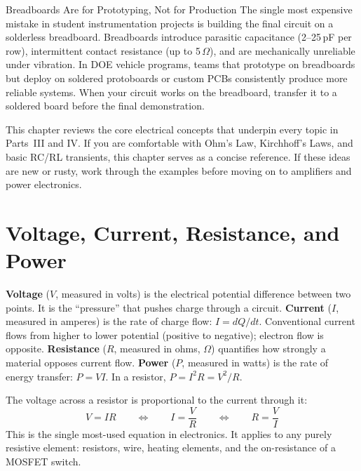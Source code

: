 \documentclass[11pt,letterpaper,twoside,openany]{book}
\begin{document}
\begin{industrybox}{Breadboards Are for Prototyping, Not for Production}
The single most expensive mistake in student instrumentation projects is building the final circuit on a solderless breadboard. Breadboards introduce parasitic capacitance (2--25\,pF per row), intermittent contact resistance (up to 5\,$\Omega$), and are mechanically unreliable under vibration. In DOE vehicle programs, teams that prototype on breadboards but deploy on soldered protoboards or custom PCBs consistently produce more reliable systems. When your circuit works on the breadboard, transfer it to a soldered board before the final demonstration.
\end{industrybox}

This chapter reviews the core electrical concepts that underpin every topic in Parts~III and IV. If you are comfortable with Ohm's Law, Kirchhoff's Laws, and basic RC/RL transients, this chapter serves as a concise reference. If these ideas are new or rusty, work through the examples before moving on to amplifiers and power electronics.

\section{Voltage, Current, Resistance, and Power}

\textbf{Voltage} ($V$, measured in volts) is the electrical potential difference between two points. It is the ``pressure'' that pushes charge through a circuit. \textbf{Current} ($I$, measured in amperes) is the rate of charge flow: $I = dQ/dt$. Conventional current flows from higher to lower potential (positive to negative); electron flow is opposite. \textbf{Resistance} ($R$, measured in ohms, $\Omega$) quantifies how strongly a material opposes current flow. \textbf{Power} ($P$, measured in watts) is the rate of energy transfer: $P = VI$. In a resistor, $P = I^2 R = V^2/R$.

\begin{keyconceptbox}
The voltage across a resistor is proportional to the current through it:
\begin{equation}
V = IR \qquad \Leftrightarrow \qquad I = \frac{V}{R} \qquad \Leftrightarrow \qquad R = \frac{V}{I}
\end{equation}
This is the single most-used equation in electronics. It applies to any purely resistive element: resistors, wire, heating elements, and the on-resistance of a MOSFET switch.
\end{keyconceptbox}
\end{document}
